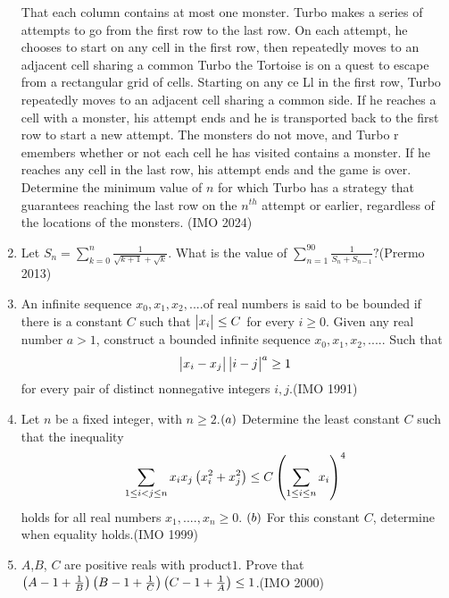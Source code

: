 \begin{enumerate}
That each column contains at most one monster.
Turbo makes a series of attempts to go from the first row to the last row. On each attempt, he chooses   to start on any cell in the first row, then repeatedly moves to an adjacent cell sharing a common Turbo the Tortoise is on a quest to escape from a rectangular grid of cells. Starting on any ce
Ll in the first row, Turbo repeatedly moves to an adjacent cell sharing a common side. If he reaches a cell with a monster, his attempt ends and he is transported back to the first row to start a new attempt. The monsters do not move, and Turbo r
emembers whether or not each cell he has visited contains a monster. If he reaches any cell in the last row, his attempt ends and the game is over.
Determine the minimum value of $ n $ for which Turbo has a strategy that guarantees reaching the last row on the  $n^{th}$ attempt or earlier, regardless of the locations of the monsters. \hfill(IMO 2024) 
\item Let
$ S_n = \sum_{k=0}^{n} \frac{1}{\sqrt{k+1} + \sqrt{k}}. $
What is the value of 
$ \sum_{n=1}^{90} \frac{1}{S_n + S_{n-1}}? $\hfill(Prermo 2013)

\item An infinite sequence $x_0, x_1, x_2,.... $of real numbers is said to be bounded if there is a constant $C$ such that $\begin{vmatrix}x_i\end{vmatrix} \leq C$ for every $i \geq 0$.
	  Given any real number $a > 1$, construct a bounded infinite sequence $x_0, x_1, x_2,.....$ Such that
	  \begin{align*}\begin{vmatrix}x_i-x_j\end{vmatrix}\begin{vmatrix}i-j\end{vmatrix}^a \geq 1 \end{align*}
	  for every pair of distinct nonnegative integers $i, j$.\hfill(IMO 1991)
	  \item  Let $n$ be a fixed integer, with $n \geq 2$.$\left(a\right)$ Determine the least constant $C$ such that the inequality \begin{align*}\sum_{1\leq i<j\leq n} {x_{i}} {x_{j}} \left(x_{i}^2 + x_{j}^2\right) \leq C \left(\sum_{1\leq i\leq n} x_{i}\right)^4\end{align*} holds for all real numbers ${x_{1}},....,{x_{n}} \geq 0$. $\left(b\right)$ For this constant $C$, determine when equality holds.\hfill(IMO 1999) 

\item  $A$,$ B$, $C$ are positive reals with product$1$. Prove that $\left(A-1+\frac{1}{B}\right)\left(B-1+\frac{1}{C}\right)\left(C-1+\frac{1}{A}\right) \leq 1$.\hfill(IMO 2000)


\end{enumerate}
